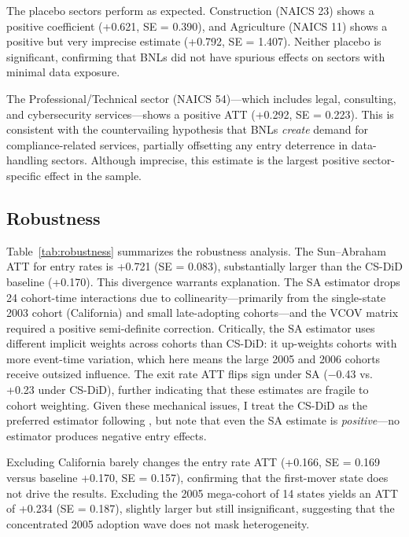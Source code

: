 \documentclass[12pt]{article}
\begin{document}
The placebo sectors perform as expected. Construction (NAICS 23) shows a positive coefficient (+0.621, SE = 0.390), and Agriculture (NAICS 11) shows a positive but very imprecise estimate (+0.792, SE = 1.407). Neither placebo is significant, confirming that BNLs did not have spurious effects on sectors with minimal data exposure.

The Professional/Technical sector (NAICS 54)---which includes legal, consulting, and cybersecurity services---shows a positive ATT (+0.292, SE = 0.223). This is consistent with the countervailing hypothesis that BNLs \textit{create} demand for compliance-related services, partially offsetting any entry deterrence in data-handling sectors. Although imprecise, this estimate is the largest positive sector-specific effect in the sample.

\subsection{Robustness}



Table~\ref{tab:robustness} summarizes the robustness analysis. The Sun--Abraham ATT for entry rates is +0.721 (SE = 0.083), substantially larger than the CS-DiD baseline (+0.170). This divergence warrants explanation. The SA estimator drops 24 cohort-time interactions due to collinearity---primarily from the single-state 2003 cohort (California) and small late-adopting cohorts---and the VCOV matrix required a positive semi-definite correction. Critically, the SA estimator uses different implicit weights across cohorts than CS-DiD: it up-weights cohorts with more event-time variation, which here means the large 2005 and 2006 cohorts receive outsized influence. The exit rate ATT flips sign under SA ($-$0.43 vs. +0.23 under CS-DiD), further indicating that these estimates are fragile to cohort weighting. Given these mechanical issues, I treat the CS-DiD as the preferred estimator following \citet{baker2019much}, but note that even the SA estimate is \textit{positive}---no estimator produces negative entry effects.

Excluding California barely changes the entry rate ATT (+0.166, SE = 0.169 versus baseline +0.170, SE = 0.157), confirming that the first-mover state does not drive the results. Excluding the 2005 mega-cohort of 14 states yields an ATT of +0.234 (SE = 0.187), slightly larger but still insignificant, suggesting that the concentrated 2005 adoption wave does not mask heterogeneity.
\end{document}
